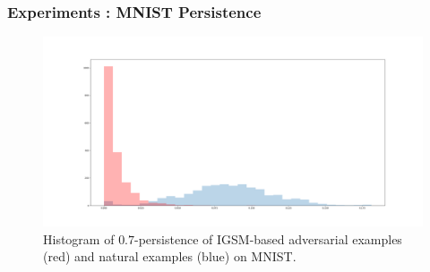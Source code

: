 

\begin{frame}
  \frametitle{Experiments : MNIST Persistence}
 \begin{figure}[!ht]
 \centering
 \includegraphics[trim=200 80 100 100, clip,width=.5\textwidth]{c3_figures/original_hist.png}
 \caption{Histogram of $0.7$-persistence of IGSM-based adversarial examples (red) and natural examples (blue) on MNIST. %
 }

 \label{fig:IGSMpersistenceMNIST}
 \end{figure}
\end{frame}



